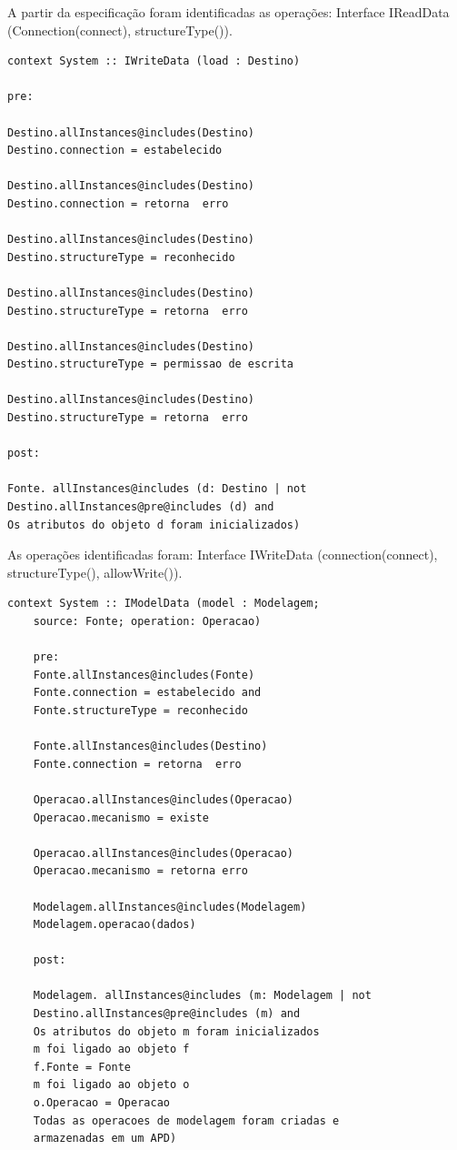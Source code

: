 A partir da especificação foram identificadas as operações: Interface IReadData (Connection(connect), structureType()).

\begin{lstlisting}[frame=single, language=Oberon-2]
context System :: IWriteData (load : Destino)

pre:

Destino.allInstances@includes(Destino) 
Destino.connection = estabelecido

Destino.allInstances@includes(Destino) 
Destino.connection = retorna  erro

Destino.allInstances@includes(Destino)
Destino.structureType = reconhecido

Destino.allInstances@includes(Destino)
Destino.structureType = retorna  erro

Destino.allInstances@includes(Destino) 
Destino.structureType = permissao de escrita

Destino.allInstances@includes(Destino)
Destino.structureType = retorna  erro

post:

Fonte. allInstances@includes (d: Destino | not 
Destino.allInstances@pre@includes (d) and
Os atributos do objeto d foram inicializados)
\end{lstlisting}

As operações identificadas foram: Interface IWriteData (connection(connect), structureType(), allowWrite()).

\begin{lstlisting}[frame=single, language=Oberon-2]
	context System :: IModelData (model : Modelagem; 
	source: Fonte; operation: Operacao)
	
	pre:
	Fonte.allInstances@includes(Fonte) 
	Fonte.connection = estabelecido and  
	Fonte.structureType = reconhecido
	
	Fonte.allInstances@includes(Destino) 
	Fonte.connection = retorna  erro
	
	Operacao.allInstances@includes(Operacao) 
	Operacao.mecanismo = existe
	
	Operacao.allInstances@includes(Operacao) 
	Operacao.mecanismo = retorna erro
	
	Modelagem.allInstances@includes(Modelagem) 
	Modelagem.operacao(dados)
	
	post:
	
	Modelagem. allInstances@includes (m: Modelagem | not 
	Destino.allInstances@pre@includes (m) and
	Os atributos do objeto m foram inicializados
	m foi ligado ao objeto f
	f.Fonte = Fonte
	m foi ligado ao objeto o
	o.Operacao = Operacao
	Todas as operacoes de modelagem foram criadas e 
	armazenadas em um APD)
\end{lstlisting}

